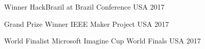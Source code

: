 


\begin{cvhonors}

  \cvhonor
    {Winner}
    {HackBrazil at Brazil Conference}
    {USA}
    {2017} %

  \cvhonor
    {Grand Prize Winner}
    {IEEE Maker Project}
    {USA}
    {2017} %

  \cvhonor
    {World Finalist}
    {Microsoft Imagine Cup World Finals}
    {USA}
    {2017} %
\end{cvhonors}



